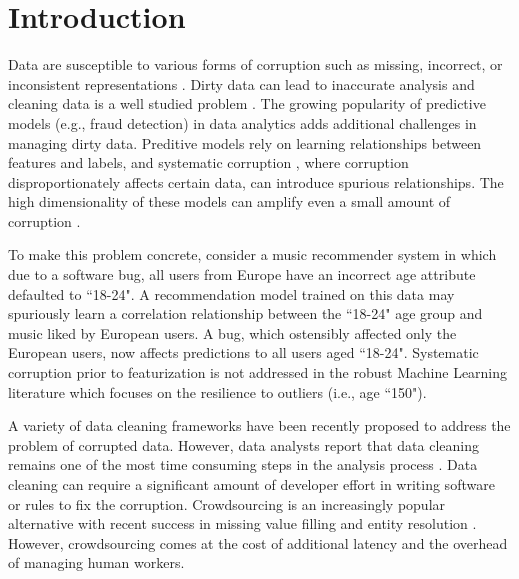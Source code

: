 \section{Introduction}
Data are susceptible to various forms of corruption such as missing, incorrect, or inconsistent representations \cite{Gartner}.
Dirty data can lead to inaccurate analysis and cleaning data is a well studied problem \cite{rahm2000data}.
The growing popularity of predictive models (e.g., fraud detection) in data analytics \cite{bdas, alexandrov2014stratosphere, crotty2014tupleware, hellerstein2012madlib} adds additional challenges in managing dirty data.
Preditive models rely on learning relationships between features and labels, and systematic corruption \cite{taylor1982introduction}, where corruption disproportionately affects certain data, can introduce spurious relationships.
The high dimensionality of these models can amplify even a small amount of corruption \cite{xiaofeature}.

To make this problem concrete, consider a music recommender system in which due to a software bug, all users from Europe have an incorrect age attribute defaulted to ``18-24".
A recommendation model trained on this data may spuriously learn a correlation relationship between the ``18-24" age group and music liked by European users.
A bug, which ostensibly affected only the European users, now affects predictions to all users aged ``18-24".
Systematic corruption prior to featurization is not addressed in the robust Machine Learning literature which focuses on the resilience to outliers (i.e., age ``150").

A variety of data cleaning frameworks have been recently proposed \cite{khayyat2015bigdansing, chu2015katara, sampleclean} to address the problem of corrupted data.
However, data analysts report that data cleaning remains one of the most time consuming steps in the analysis process \cite{nytimes}.
Data cleaning can require a significant amount of developer effort in writing software or rules to fix the corruption.
Crowdsourcing is an increasingly popular alternative with recent success in missing value filling and entity resolution \cite{gokhale2014corleone, park2014crowdfill, sampleclean,chu2015katara}.
However, crowdsourcing comes at the cost of additional latency and the overhead of managing human workers.

